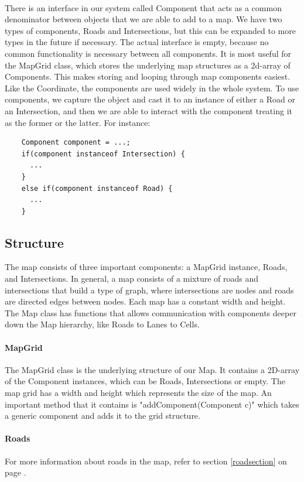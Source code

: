\documentclass[a4paper,11pt,titlepage]{article}
\begin{document}
\paragraph{}
There is an interface in our system called Component that acts as a common denominator between objects that we are able to add to a map. We have two types of components, Roads and Intersections, but this can be expanded to more types in the future if necessary. The actual interface is empty, because no common functionality is necessary between all components. It is most useful for the MapGrid class, which stores the underlying map structures as a 2d-array of Components. This makes storing and looping through map components easiest. Like the Coordinate, the components are used widely in the whole system. To use components, we capture the object and cast it to an instance of either a Road or an Intersection, and then we are able to interact with the component treating it as the former or the latter. For instance:
\begin{lstlisting}
	Component component = ...;
	if(component instanceof Intersection) {
	  ...
	}
	else if(component instanceof Road) {
	  ...        
	}
\end{lstlisting}

\subsection{Structure}
The map consists of three important components: a MapGrid instance, Roads, and Intersections. In general, a map consists of a mixture of roads and intersections that build a type of graph, where intersections are nodes and roads are directed edges between nodes. Each map has a constant width and height. The Map class has functions that allows communication with components deeper down the Map hierarchy, like Roads to Lanes to Cells. 
\paragraph{MapGrid}
The MapGrid class is the underlying structure of our Map. It contains a 2D-array of the Component instances, which can be Roads, Intersections or empty. The map grid has a width and height which represents the size of the map. An important method that it contains is "addComponent(Component c)" which takes a generic component and adds it to the grid structure.
\paragraph{Roads} For more information about roads in the map, refer to section \ref{roadsection} on page \pageref{roadsection}.
\end{document}
